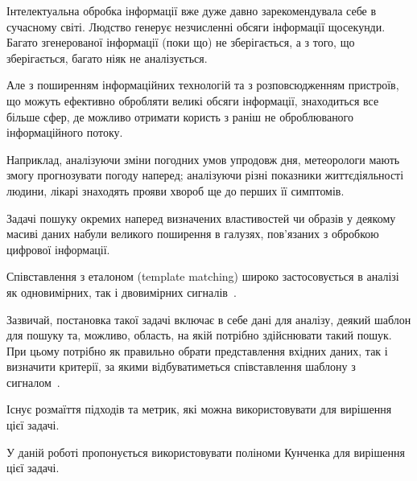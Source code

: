 \intro{}
Інтелектуальна обробка інформації вже дуже давно зарекомендувала себе в сучасному світі.
Людство генерує незчисленні обсяги інформації щосекунди.
Багато згенерованої інформації (поки що) не зберігається, а з того, що зберігається, багато ніяк не аналізується.

Але з поширенням інформаційних технологій та з розповсюдженням пристроїв, що можуть ефективно обробляти великі обсяги
інформації, знаходиться все більше сфер, де можливо отримати користь з раніш не оброблюваного інформаційного потоку.

Наприклад, аналізуючи зміни погодних умов упродовж дня, метеорологи мають змогу прогнозувати погоду наперед;
аналізуючи різні показники життєдіяльності людини, лікарі знаходять прояви хвороб ще до перших її симптомів.

Задачі пошуку окремих наперед визначених властивостей чи образів у деякому масиві даних набули великого поширення в
галузях, пов’язаних з обробкою цифрової інформації.

Співставлення з еталоном (template matching) широко застосовується в аналізі як одновимірних, так і двовимірних
сигналів~\cite{book4}.

Зазвичай, постановка такої задачі включає в себе дані для аналізу, деякий шаблон для пошуку та, можливо, область, на
якій потрібно здійснювати такий пошук.  При цьому потрібно як правильно обрати представлення вхідних даних, так і
визначити критерії, за якими відбуватиметься співставлення шаблону з сигналом~\cite{book10}.

Існує розмаїття підходів та метрик, які можна використовувати для вирішення цієї задачі.

У даній роботі пропонується використовувати поліноми Кунченка для вирішення цієї задачі.

